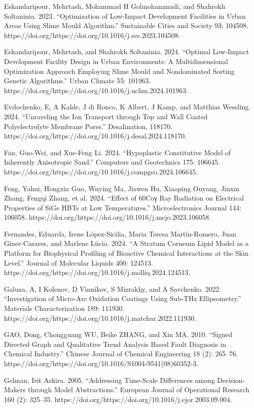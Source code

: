 \documentclass[utf8]{gradu3}
\begin{document}
Eskandaripour, Mehrtash, Mohammad H Golmohammadi, and Shahrokh Soltaninia. 2023. “Optimization of Low-Impact Development Facilities in Urban Areas Using Slime Mould Algorithm.” Sustainable Cities and Society 93: 104508. https://doi.org/https://doi.org/10.1016/j.scs.2023.104508.

Eskandaripour, Mehrtash, and Shahrokh Soltaninia. 2024. “Optimal Low-Impact Development Facility Design in Urban Environments: A Multidimensional Optimization Approach Employing Slime Mould and Nondominated Sorting Genetic Algorithms.” Urban Climate 55: 101963. https://doi.org/https://doi.org/10.1016/j.uclim.2024.101963.

Evdochenko, E, A Kalde, J di Ronco, K Albert, J Kamp, and Matthias Wessling. 2024. “Unraveling the Ion Transport through Top and Wall Coated Polyelectrolyte Membrane Pores.” Desalination, 118170. https://doi.org/https://doi.org/10.1016/j.desal.2024.118170.

Fan, Guo-Wei, and Xue-Feng Li. 2024. “Hypoplastic Constitutive Model of Inherently Anisotropic Sand.” Computers and Geotechnics 175: 106645. https://doi.org/https://doi.org/10.1016/j.compgeo.2024.106645.

Feng, Yahui, Hongxia Guo, Wuying Ma, Jiawen Hu, Xiaoping Ouyang, Jinxin Zhang, Fengqi Zhang, et al. 2024. “Effect of 60Coγ Ray Radiation on Electrical Properties of SiGe HBTs at Low Temperatures.” Microelectronics Journal 144: 106058. https://doi.org/https://doi.org/10.1016/j.mejo.2023.106058.

Fernandes, Eduarda, Irene López-Sicilia, Maria Teresa Martín-Romero, Juan Giner-Casares, and Marlene Lúcio. 2024. “A Stratum Corneum Lipid Model as a Platform for Biophysical Profiling of Bioactive Chemical Interactions at the Skin Level.” Journal of Molecular Liquids 400: 124513. https://doi.org/https://doi.org/10.1016/j.molliq.2024.124513.

Galuza, A, I Kolenov, D Vinnikov, S Mizrakhy, and A Savchenko. 2022. “Investigation of Micro-Arc Oxidation Coatings Using Sub-THz Ellipsometry.” Materials Characterization 189: 111930. https://doi.org/https://doi.org/10.1016/j.matchar.2022.111930.

GAO, Dong, Chongguang WU, Beike ZHANG, and Xin MA. 2010. “Signed Directed Graph and Qualitative Trend Analysis Based Fault Diagnosis in Chemical Industry.” Chinese Journal of Chemical Engineering 18 (2): 265–76. https://doi.org/https://doi.org/10.1016/S1004-9541(08)60352-3.

Gelman, Irit Askira. 2005. “Addressing Time-Scale Differences among Decision-Makers through Model Abstractions.” European Journal of Operational Research 160 (2): 325–35. https://doi.org/https://doi.org/10.1016/j.ejor.2003.09.004.
\end{document}
